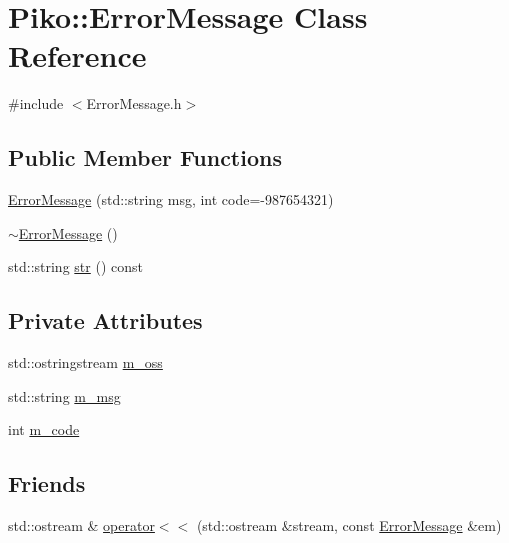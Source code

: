 \hypertarget{class_piko_1_1_error_message}{\section{Piko\-:\-:Error\-Message Class Reference}
\label{d5/d53/class_piko_1_1_error_message}
}


{\ttfamily \#include $<$Error\-Message.\-h$>$}

\subsection*{Public Member Functions}
\begin{DoxyCompactItemize}
\item 
\hyperlink{class_piko_1_1_error_message_aa11fc3041401315f8c85601a5efa9cd1}{Error\-Message} (std\-::string msg, int code=-\/987654321)
\item 
\hyperlink{class_piko_1_1_error_message_a4be6f62cf5a32daff45f50d0cb6b249e}{$\sim$\-Error\-Message} ()
\item 
std\-::string \hyperlink{class_piko_1_1_error_message_a9ad6e121fd9f6d7d3d0844828f3ecc05}{str} () const 
\end{DoxyCompactItemize}
\subsection*{Private Attributes}
\begin{DoxyCompactItemize}
\item 
std\-::ostringstream \hyperlink{class_piko_1_1_error_message_a14a696b446831809aee6782f68b6dea4}{m\-\_\-oss}
\item 
std\-::string \hyperlink{class_piko_1_1_error_message_af9c380528847837f27af105e7ccd5e47}{m\-\_\-msg}
\item 
int \hyperlink{class_piko_1_1_error_message_a44f460d5878ed89dd5f450604bb27ada}{m\-\_\-code}
\end{DoxyCompactItemize}
\subsection*{Friends}
\begin{DoxyCompactItemize}
\item 
std\-::ostream \& \hyperlink{class_piko_1_1_error_message_a3e1735daaf51ba462c0477c2b808f0f3}{operator$<$$<$} (std\-::ostream \&stream, const \hyperlink{class_piko_1_1_error_message}{Error\-Message} \&em)
\end{DoxyCompactItemize}


